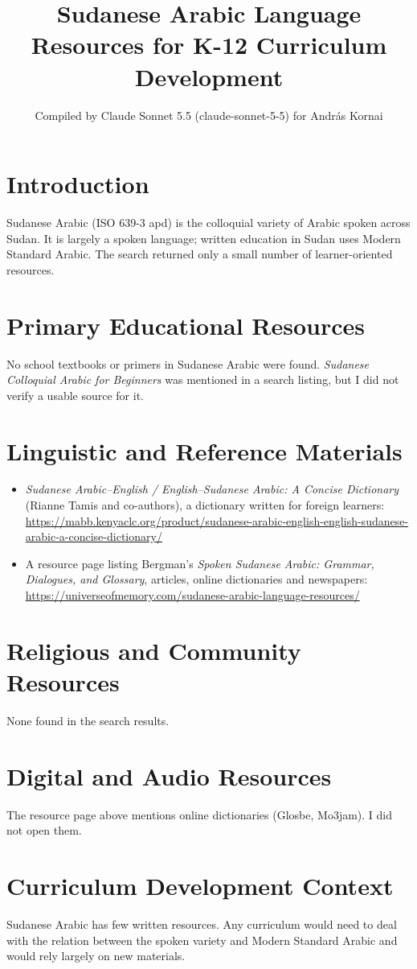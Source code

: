 \documentclass[12pt]{article}
\title{Sudanese Arabic Language Resources for K-12 Curriculum Development}
\author{Compiled by Claude Sonnet 5.5 (claude-sonnet-5-5) for Andr\'as Kornai}
\date{}
\begin{document}
\maketitle

\section{Introduction}
Sudanese Arabic (ISO 639-3 apd) is the colloquial variety of Arabic spoken across Sudan. It is largely a spoken language; written education in Sudan uses Modern Standard Arabic. The search returned only a small number of learner-oriented resources.

\section{Primary Educational Resources}
No school textbooks or primers in Sudanese Arabic were found. \emph{Sudanese Colloquial Arabic for Beginners} was mentioned in a search listing, but I did not verify a usable source for it.

\section{Linguistic and Reference Materials}
\begin{itemize}
\item \emph{Sudanese Arabic--English / English--Sudanese Arabic: A Concise Dictionary} (Rianne Tamis and co-authors), a dictionary written for foreign learners: \url{https://mabb.kenyaclc.org/product/sudanese-arabic-english-english-sudanese-arabic-a-concise-dictionary/}
\item A resource page listing Bergman's \emph{Spoken Sudanese Arabic: Grammar, Dialogues, and Glossary}, articles, online dictionaries and newspapers: \url{https://universeofmemory.com/sudanese-arabic-language-resources/}
\end{itemize}

\section{Religious and Community Resources}
None found in the search results.

\section{Digital and Audio Resources}
The resource page above mentions online dictionaries (Glosbe, Mo3jam). I did not open them.

\section{Curriculum Development Context}
Sudanese Arabic has few written resources. Any curriculum would need to deal with the relation between the spoken variety and Modern Standard Arabic and would rely largely on new materials.
\end{document}
